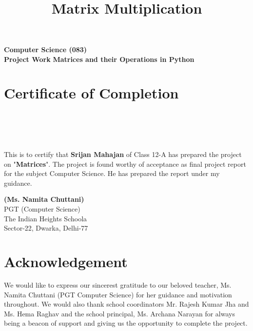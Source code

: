 


\lstset{style=mystyle}
\title{Matrix Multiplication}


\begin{titlepage}
	\begin{center}
		\huge \textbf{Computer Science (083)}\\ \textbf{Project Work }\vfil
		\vfil
		\textbf{Matrices and their Operations in Python}\\
	\end{center}
\end{titlepage}
\tableofcontents
\newpage
\section*{Certificate of Completion}
\phantom \\ \\ \\ \\ 
This is to certify that \textbf{Srijan Mahajan} of Class 12-A has prepared the project on "\textbf{Matrices}". The project is found worthy of acceptance as final project report for the subject Computer Science. He has prepared the report under my guidance.
\vfill
\begin{flushright}
	\textbf{(Ms. Namita Chuttani)}\\
	PGT (Computer Science)\\
	The Indian Heights Schoola\\
	Sector-22, Dwarka, Delhi-77
\end{flushright}
\newpage
\section*{Acknowledgement}
We would like to express our sincerest gratitude to our beloved teacher, Ms. Namita Chuttani (PGT Computer Science) for her guidance and motivation throughout. We would also thank school coordinators Mr. Rajesh Kumar Jha and Ms. Hema Raghav and the school principal, Ms. Archana Narayan for always being a beacon of support and giving us the opportunity to complete the project. 

